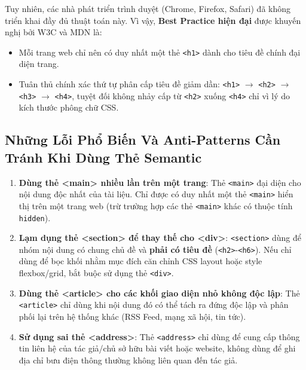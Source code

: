 \documentclass[11pt,oneside]{book}
\newcommand{\codeinline}[1]{\textcolor{accentOrange}{\texttt{#1}}}
\begin{document}
Tuy nhiên, các nhà phát triển trình duyệt (Chrome, Firefox, Safari) đã không triển khai đầy đủ thuật toán này. Vì vậy, \textbf{Best Practice hiện đại} được khuyến nghị bởi W3C và MDN là:
\begin{itemize}[leftmargin=1.8em, itemsep=3pt, parsep=0pt]
    \item Mỗi trang web chỉ nên có duy nhất một thẻ \codeinline{<h1>} dành cho tiêu đề chính đại diện trang.
    \item Tuân thủ chính xác thứ tự phân cấp tiêu đề giảm dần: \codeinline{<h1>} $\rightarrow$ \codeinline{<h2>} $\rightarrow$ \codeinline{<h3>} $\rightarrow$ \codeinline{<h4>}, tuyệt đối không nhảy cấp từ \codeinline{<h2>} xuống \codeinline{<h4>} chỉ vì lý do kích thước phông chữ CSS.
\end{itemize}

\subsection{Những Lỗi Phổ Biến Và Anti-Patterns Cần Tránh Khi Dùng Thẻ Semantic}

\begin{warnBox}
\begin{enumerate}[leftmargin=1.5em, itemsep=4pt, parsep=0pt]
    \item \textbf{Dùng thẻ <main> nhiều lần trên một trang}: Thẻ \codeinline{<main>} đại diện cho nội dung độc nhất của tài liệu. Chỉ được có duy nhất một thẻ \codeinline{<main>} hiển thị trên một trang web (trừ trường hợp các thẻ \codeinline{<main>} khác có thuộc tính \codeinline{hidden}).
    \item \textbf{Lạm dụng thẻ <section> để thay thế cho <div>}: \codeinline{<section>} dùng để nhóm nội dung có chung chủ đề và \textbf{phải có tiêu đề} (\codeinline{<h2>}-\codeinline{<h6>}). Nếu chỉ dùng để bọc khối nhằm mục đích căn chỉnh CSS layout hoặc style flexbox/grid, bắt buộc sử dụng thẻ \codeinline{<div>}.
    \item \textbf{Dùng thẻ <article> cho các khối giao diện nhỏ không độc lập}: Thẻ \codeinline{<article>} chỉ dùng khi nội dung đó có thể tách ra đứng độc lập và phân phối lại trên hệ thống khác (RSS Feed, mạng xã hội, tin tức).
    \item \textbf{Sử dụng sai thẻ <address>}: Thẻ \codeinline{<address>} chỉ dùng để cung cấp thông tin liên hệ của tác giả/chủ sở hữu bài viết hoặc website, không dùng để ghi địa chỉ bưu điện thông thường không liên quan đến tác giả.
\end{enumerate}
\end{warnBox}
\end{document}
